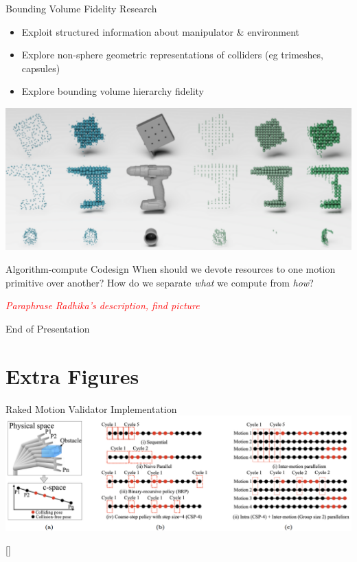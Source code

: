 \documentclass{beamer}
\newcommand{\todo}[1]{\textit{\textcolor{red}{#1}}}
\begin{document}
\begin{frame}{Bounding Volume Fidelity Research}
\begin{itemize}
\item Exploit structured information about manipulator \& environment
\item Explore non-sphere geometric representations of colliders (eg trimeshes, capsules)
\item Explore bounding volume hierarchy fidelity
\end{itemize}
\centering
\includegraphics[height=0.37\textheight]{./assets/geom_fidelity.png}
\end{frame}

\begin{frame}{Algorithm-compute Codesign}
When should we devote resources to one motion primitive over another? How do we separate \textit{what} we compute from \textit{how}?

\todo{Paraphrase Radhika's description, find picture}
\end{frame}

\begin{frame}{End of Presentation}
\end{frame}

\section{Extra Figures}

\begin{frame}{Raked Motion Validator Implementation}
\includegraphics[width=\textwidth]{./assets/eemp_mv.png}

[\cite{paper:eemp}]
\end{frame}
\end{document}
